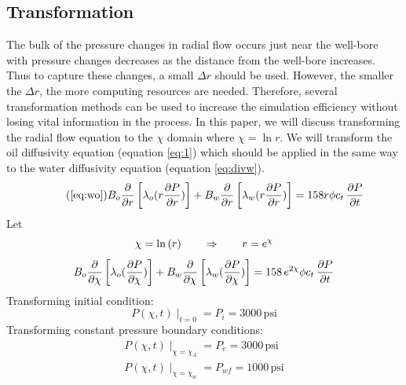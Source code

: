 \documentclass[12pt,letterpaper,titlepage]{article}
\begin{document}
\subsection{Transformation}
The bulk of the pressure changes in radial flow occurs just near the well-bore with pressure changes decreases as the distance from the well-bore increases. Thus to capture these changes, a small $\Delta r$ should be used. However, the smaller the $\Delta r$, the more computing resources are needed. Therefore, several transformation methods can be used to increase the simulation efficiency without losing vital information in the process. In this paper, we will discuss transforming the radial flow equation to the $\chi$ domain where $\chi=\ln{r}$. We will transform the oil diffusivity equation (equation \ref{eq:1}) which should be applied in the same way to the water diffusivity equation (equation \ref{eq:divw}).
\begin{equation*}
\tag{\ref{eq:wo}}
B_o\pdv{}{r}\left[\lambda_o(r\pdv{P}{r})\right]+ B_w\pdv{}{r}\left[\lambda_w(r\pdv{P}{r})\right] = 158 r\phi c_t\, \pdv{P}{t}
\end{equation*}
Let $$\chi=\ln{(r)}\qquad \Rightarrow \qquad r=e^{\chi}\\$$
\begin{equation}\label{eq:2}
B_o\pdv{}{\chi}\left[\lambda_o(\pdv{P}{\chi})\right]+ B_w\pdv{}{\chi}\left[\lambda_w(\pdv{P}{\chi})\right] = 158\, e^{2 \chi}\phi c_t\, \pdv{P}{t}
\end{equation} 
Transforming initial condition:
\begin{equation}
P(\chi,t)\mid_{t=0}=P_i=3000\,\text{psi}
\end{equation}
Transforming constant pressure boundary conditions:
\begin{gather}
P(\chi,t)\mid_{\chi=\chi_A}=P_e=3000\,\text{psi}\\
P(\chi,t)\mid_{\chi=\chi_w}=P_{wf}=1000\,\text{psi}
\end{gather}
\end{document}
